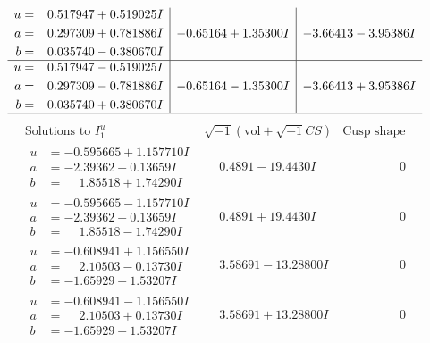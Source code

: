 \documentclass[1p]{elsarticle_modified}
\theoremstyle{definition}
\newcommand{\I}{\sqrt{-1}}
\begin{document}
$$\begin{array}{c|c|c}
\begin{aligned}
u &= \phantom{-}0.517947 + 0.519025 I \\
a &= \phantom{-}0.297309 + 0.781886 I \\
b &= \phantom{-}0.035740 - 0.380670 I\end{aligned}
 & -0.65164 + 1.35300 I & -3.66413 - 3.95386 I \\ \hline\begin{aligned}
u &= \phantom{-}0.517947 - 0.519025 I \\
a &= \phantom{-}0.297309 - 0.781886 I \\
b &= \phantom{-}0.035740 + 0.380670 I\end{aligned}
 & -0.65164 - 1.35300 I & -3.66413 + 3.95386 I\\
 \hline 
 \end{array}$$\newpage$$\begin{array}{c|c|c}  
\text{Solutions to }I^u_{1}& \I (\text{vol} + \sqrt{-1}CS) & \text{Cusp shape}\\
 \hline 
\begin{aligned}
u &= -0.595665 + 1.157710 I \\
a &= -2.39362 + 0.13659 I \\
b &= \phantom{-}1.85518 + 1.74290 I\end{aligned}
 & \phantom{-}0.4891 - 19.4430 I & \phantom{-0.000000 } 0 \\ \hline\begin{aligned}
u &= -0.595665 - 1.157710 I \\
a &= -2.39362 - 0.13659 I \\
b &= \phantom{-}1.85518 - 1.74290 I\end{aligned}
 & \phantom{-}0.4891 + 19.4430 I & \phantom{-0.000000 } 0 \\ \hline\begin{aligned}
u &= -0.608941 + 1.156550 I \\
a &= \phantom{-}2.10503 - 0.13730 I \\
b &= -1.65929 - 1.53207 I\end{aligned}
 & \phantom{-}3.58691 - 13.28800 I & \phantom{-0.000000 } 0 \\ \hline\begin{aligned}
u &= -0.608941 - 1.156550 I \\
a &= \phantom{-}2.10503 + 0.13730 I \\
b &= -1.65929 + 1.53207 I\end{aligned}
 & \phantom{-}3.58691 + 13.28800 I & \phantom{-0.000000 } 0 \\ \hline\begin{aligned}

\end{aligned}
\end{array}$$
\end{document}

